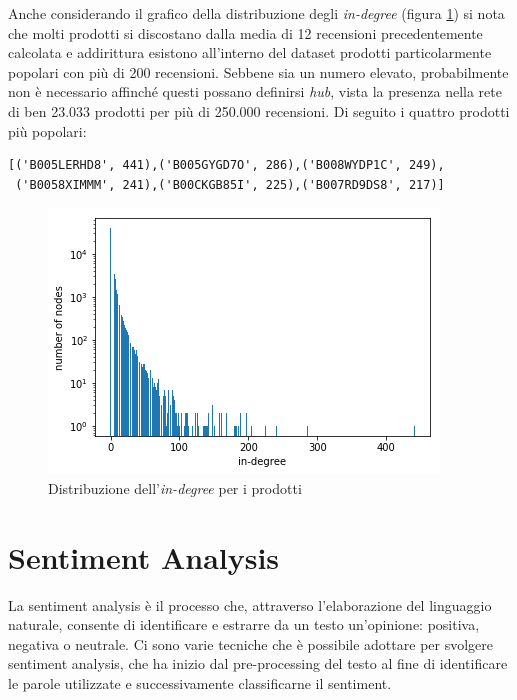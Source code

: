 \documentclass[hidelinks, 12pt]{article}
\begin{document}
Anche considerando il grafico della distribuzione degli \textit{in-degree} (figura \ref{fig:in-degree}) si nota che molti prodotti si discostano dalla media di 12 recensioni precedentemente calcolata e addirittura esistono all'interno del dataset prodotti particolarmente popolari con più di 200 recensioni. Sebbene sia un numero elevato, probabilmente non è necessario affinché questi possano definirsi \textit{hub}, vista la presenza nella rete di ben 23.033 prodotti per più di 250.000 recensioni. Di seguito i quattro prodotti più popolari:

\begin{verbatim}
[('B005LERHD8', 441),('B005GYGD7O', 286),('B008WYDP1C', 249),
 ('B0058XIMMM', 241),('B00CKGB85I', 225),('B007RD9DS8', 217)]
\end{verbatim}

\begin{figure}[H]
\centering
\includegraphics[scale=0.7]{images/03_04_in_degree.png}
\caption[Distribuzione dell'\textit{in-degree} per i prodotti]{Distribuzione dell'\textit{in-degree} per i prodotti}
\label{fig:in-degree}
\end{figure}



\clearpage



\section{Sentiment Analysis}


La sentiment analysis è il processo che, attraverso l'elaborazione del linguaggio naturale, consente di identificare e estrarre da un testo un'opinione: positiva, negativa o neutrale. Ci sono varie tecniche che è possibile adottare per svolgere sentiment analysis, che ha inizio dal pre-processing del testo al fine di identificare le parole utilizzate e successivamente classificarne il sentiment.
\end{document}
